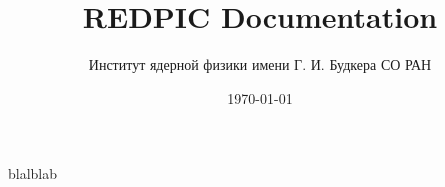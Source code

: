 \documentclass[a4paper,12pt]{article}
\title{REDPIC Documentation}
\author{Институт ядерной физики имени Г. И. Будкера СО РАН}
\date{\today}
\begin{document}
    \maketitle
    
    \tableofcontents
    
    \printbibliography
    blalblab
\end{document}
